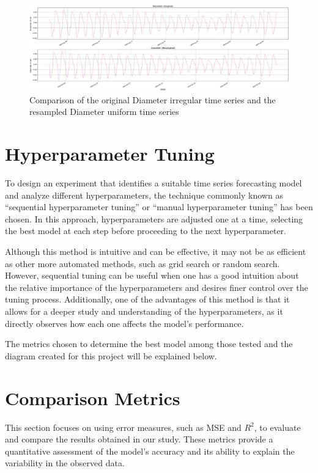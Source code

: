 \begin{figure}[htbp]
    \centering
    \includegraphics[width=15 cm]{5_ChapterDesign/figuras/5_Irregular/comparison_Diameter.pdf}
    \caption{Comparison of the original Diameter irregular time series and the resampled Diameter uniform time series}
\end{figure}

\section{Hyperparameter Tuning}

To design an experiment that identifies a suitable time series forecasting model and analyze different hyperparameters, the technique commonly known as ``sequential hyperparameter tuning'' or ``manual hyperparameter tuning'' has been chosen. In this approach, hyperparameters are adjusted one at a time, selecting the best model at each step before proceeding to the next hyperparameter.

Although this method is intuitive and can be effective, it may not be as efficient as other more automated methods, such as grid search or random search. However, sequential tuning can be useful when one has a good intuition about the relative importance of the hyperparameters and desires finer control over the tuning process. Additionally, one of the advantages of this method is that it allows for a deeper study and understanding of the hyperparameters, as it directly observes how each one affects the model's performance.

The metrics chosen to determine the best model among those tested and the diagram created for this project will be explained below.

\section*{Comparison Metrics}

This section focuses on using error measures, such as MSE and \( R^2 \), to evaluate and compare the results obtained in our study. These metrics provide a quantitative assessment of the model's accuracy and its ability to explain the variability in the observed data.

